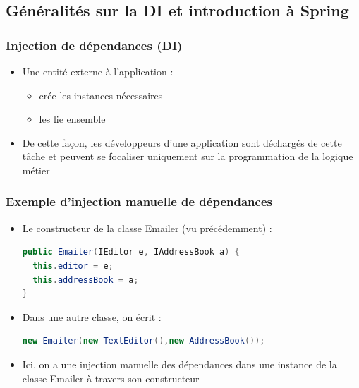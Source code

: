\documentclass{beamer}
\begin{document}
\subsection{Généralités sur la DI et introduction à Spring}
\begin{frame}
  \frametitle{Injection de dépendances (DI)}
  \begin{itemize}
  \item Une entité externe à l'application :
    \begin{itemize}
    \item crée les instances nécessaires
    \item les lie ensemble
    \end{itemize}
  \item De cette façon, les développeurs d'une application sont
    déchargés de cette tâche et peuvent se focaliser uniquement sur la
    programmation de la logique métier
  \end{itemize}
\end{frame}

\begin{frame}[fragile]
  \frametitle{Exemple d'injection manuelle de dépendances}
  \begin{itemize}
  \item Le constructeur de la classe Emailer (vu précédemment) :
\begin{lstlisting}[language=Java]
public Emailer(IEditor e, IAddressBook a) {
  this.editor = e;
  this.addressBook = a;
}
\end{lstlisting}        
  \item Dans une autre classe, on écrit :
\begin{lstlisting}[language=Java]
new Emailer(new TextEditor(),new AddressBook());
\end{lstlisting}          
  \item Ici, on a une injection manuelle des dépendances dans une
    instance de la classe Emailer à travers son constructeur
  \end{itemize}
\end{frame}
\end{document}

